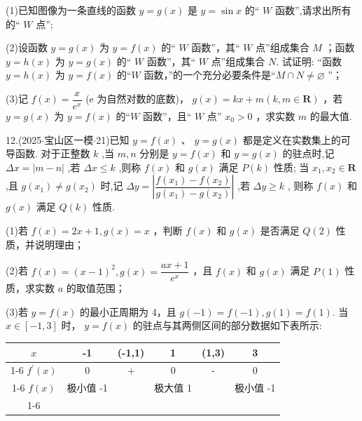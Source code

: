 (1)已知图像为一条直线的函数 $y = g\left( x\right)$ 是 $y = \sin x$ 的“ $W$ 函数”,请求出所有的“ $W$ 点”;

(2)设函数 $y = g\left( x\right)$ 为 $y = f\left( x\right)$ 的“ $W$ 函数”，其“ $W$ 点”组成集合 $M$ ；函数 $y = h\left( x\right)$ 为 $y = g\left( x\right)$ 的“ $W$ 函数”，其“ $W$ 点”组成集合 $N$. 试证明: “函数 $y = h\left( x\right)$ 为 $y = f\left( x\right)$ 的“$W$ 函数，”的一个充分必要条件是“$M \cap  N \neq  \varnothing$ ”；

(3)记 $f\left( x\right)  = \dfrac{x}{{{e}}^{x}}$ (e 为自然对数的底数)， $g\left( x\right)  = {kx} + m\left( {k,m \in  \mathbf{R}}\right)$ ，若 $y = g\left( x\right)$ 为 $y = f\left( x\right)$ 的“$W$ 函数”，且“ $W$ 点” ${x}_{0} > 0$ ，求实数 $m$ 的最大值.

12.(2025$\cdot$宝山区一模$\cdot$21)已知 $y = f\left( x\right)$ 、 $y = g\left( x\right)$ 都是定义在实数集上的可导函数. 对于正整数 $k$ ,当 $m,n$ 分别是 $y = f\left( x\right)$ 和 $y = g\left( x\right)$ 的驻点时,记 ${\Delta x} = \left| {m - n}\right|$ ,若 ${\Delta x} \leq  k$ ,则称 $f\left( x\right)$ 和 $g\left( x\right)$ 满足 $P\left( k\right)$ 性质; 当 ${x}_{1},{x}_{2} \in  \mathbf{R}$ ,且 $g\left( {x}_{1}\right)  \neq  g\left( {x}_{2}\right)$ 时,记 ${\Delta y} = \left| \dfrac{f\left( {x}_{1}\right)  - f\left( {x}_{2}\right) }{g\left( {x}_{1}\right)  - g\left( {x}_{2}\right) }\right|$ ,若 ${\Delta y} \geq  k$ , 则称 $f\left( x\right)$ 和 $g\left( x\right)$ 满足 $Q\left( k\right)$ 性质.

(1)若 $f\left( x\right)  = {2x} + 1,g\left( x\right)  = x$ ，判断 $f\left( x\right)$ 和 $g\left( x\right)$ 是否满足 $Q\left( 2\right)$ 性质，并说明理由；

(2)若 $f\left( x\right)  = {\left( x - 1\right) }^{2},g\left( x\right)  = \dfrac{{ax} + 1}{{{e}}^{x}}$ ，且 $f\left( x\right)$ 和 $g\left( x\right)$ 满足 $P\left( 1\right)$ 性质，求实数 $a$ 的取值范围；

(3)若 $y = f\left( x\right)$ 的最小正周期为 4，且 $g\left( {-1}\right)  = f\left( {-1}\right) ,g\left( 1\right)  = f\left( 1\right)$. 当 $x \in  \left\lbrack  {-1,3}\right\rbrack$ 时， $y =  f\left( x\right)$ 的驻点与其两侧区间的部分数据如下表所示:

\begin{center}

\begin{tabular}{|c|c|c|c|c|c|}
\hline
$x$ & -1 & (-1,1) & 1 & (1,3) & 3 \\
\cline{1-6}
${f}^{\prime }\left( x\right)$ & 0 & + & 0 & - & 0 \\
\cline{1-6}
$f\left( x\right)$ & 极小值 -1 & \phantom{X} & 极大值 1 & \phantom{X} & 极小值 -1 \\
\cline{1-6}
\hline
\end{tabular}
\end{center}

